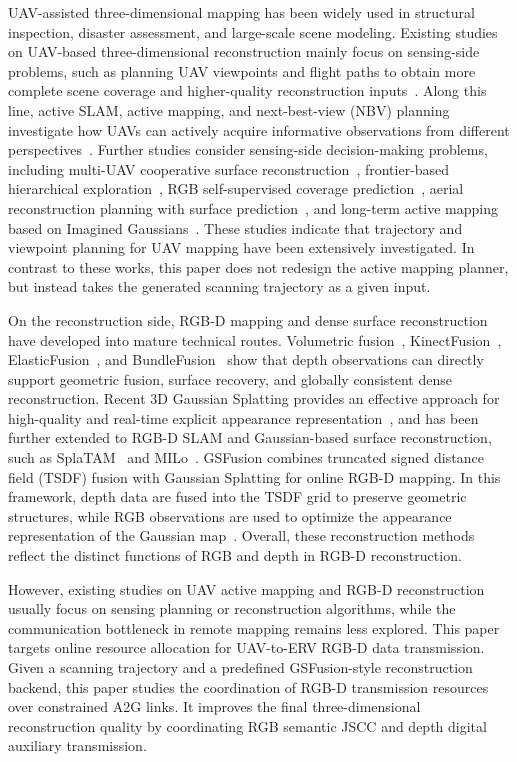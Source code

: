 \documentclass[journal]{IEEEtran}
\begin{document}
UAV-assisted three-dimensional mapping has been widely used in structural inspection, disaster assessment, and large-scale scene modeling. Existing studies on UAV-based three-dimensional reconstruction mainly focus on sensing-side problems, such as planning UAV viewpoints and flight paths to obtain more complete scene coverage and higher-quality reconstruction inputs~\cite{C1}. Along this line, active SLAM, active mapping, and next-best-view (NBV) planning investigate how UAVs can actively acquire informative observations from different perspectives~\cite{C2}. Further studies consider sensing-side decision-making problems, including multi-UAV cooperative surface reconstruction~\cite{C3}, frontier-based hierarchical exploration~\cite{C4}, RGB self-supervised coverage prediction~\cite{C5}, aerial reconstruction planning with surface prediction~\cite{C6}, and long-term active mapping based on Imagined Gaussians~\cite{C7}. These studies indicate that trajectory and viewpoint planning for UAV mapping have been extensively investigated. In contrast to these works, this paper does not redesign the active mapping planner, but instead takes the generated scanning trajectory as a given input.

On the reconstruction side, RGB-D mapping and dense surface reconstruction have developed into mature technical routes. Volumetric fusion~\cite{C8}, KinectFusion~\cite{C9}, ElasticFusion~\cite{C10}, and BundleFusion~\cite{C11} show that depth observations can directly support geometric fusion, surface recovery, and globally consistent dense reconstruction. Recent 3D Gaussian Splatting provides an effective approach for high-quality and real-time explicit appearance representation~\cite{C12}, and has been further extended to RGB-D SLAM and Gaussian-based surface reconstruction, such as SplaTAM~\cite{C13} and MILo~\cite{C14}. GSFusion combines truncated signed distance field (TSDF) fusion with Gaussian Splatting for online RGB-D mapping. In this framework, depth data are fused into the TSDF grid to preserve geometric structures, while RGB observations are used to optimize the appearance representation of the Gaussian map~\cite{A12}. Overall, these reconstruction methods reflect the distinct functions of RGB and depth in RGB-D reconstruction.

However, existing studies on UAV active mapping and RGB-D reconstruction usually focus on sensing planning or reconstruction algorithms, while the communication bottleneck in remote mapping remains less explored. This paper targets online resource allocation for UAV-to-ERV RGB-D data transmission. Given a scanning trajectory and a predefined GSFusion-style reconstruction backend, this paper studies the coordination of RGB-D transmission resources over constrained A2G links. It improves the final three-dimensional reconstruction quality by coordinating RGB semantic JSCC and depth digital auxiliary transmission.
\end{document}
